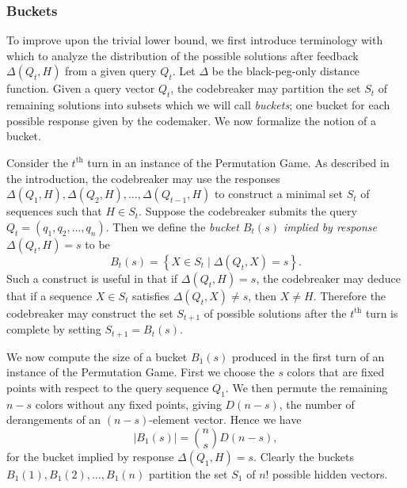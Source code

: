 \documentclass[12pt, a4paper]{article}
\newcommand{\nth}{^{\text{th}}}       %
\begin{document}
	\subsubsection{Buckets}
	To improve upon the trivial lower bound, we first introduce terminology with which to analyze the distribution of the possible solutions after feedback $\Delta(Q_t, H)$ from a given query $Q_t$. Let $\Delta$ be the black-peg-only distance function. Given a query vector $Q_t$, the codebreaker may partition the set $S_t$ of remaining solutions into subsets which we will call \textit{buckets}; one bucket for each possible response given by the codemaker. We now formalize the notion of a bucket.
	
	Consider the $t\nth$ turn in an instance of the Permutation Game. As described in the introduction, the codebreaker may use the responses $\Delta(Q_1, H), \Delta(Q_2, H), \ldots, \Delta(Q_{t-1}, H)$ to construct a minimal set $S_t$ of sequences such that $H\in S_t$. Suppose the codebreaker submits the query $Q_t = (q_1, q_2, \ldots, q_n)$. Then we define the \textit{bucket $B_t(s)$ implied by response $\Delta(Q_t, H)=s$} to be
	\begin{equation*}
		B_t(s) = \left\{X\in S_t\mid \Delta(Q_t, X) = s\right\}.
	\end{equation*}
	Such a construct is useful in that if $\Delta(Q_t, H) = s$, the codebreaker may deduce that if a sequence $X\in S_t$ satisfies $\Delta(Q_t, X)\neq s$, then $X\neq H$. Therefore the codebreaker may construct the set $S_{t+1}$ of possible solutions after the $t\nth$ turn is complete by setting $S_{t+1} = B_t(s)$.
	
	We now compute the size of a bucket $B_1(s)$ produced in the first turn of an instance of the Permutation Game. First we choose the $s$ colors that are fixed points with respect to the query sequence $Q_1$. We then permute the remaining $n-s$ colors without any fixed points, giving $D(n - s)$, the number of derangements of an $(n-s)$-element vector. Hence we have
	\begin{equation*}
		|B_1(s)| = \binom{n}{s}D(n-s),
	\end{equation*}
	for the bucket implied by response $\Delta(Q_1, H) = s$. Clearly the buckets $B_1(1), B_1(2), \ldots, B_1(n)$ partition the set $S_1$ of $n!$ possible hidden vectors.
	
\end{document}
